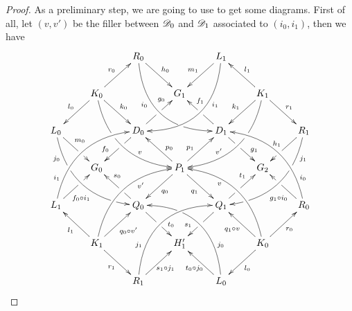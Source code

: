 \begin{proof}  As a preliminary step, we are going to use  to get some diagrams.  First of all, let $(v,v')$ be the filler between $\mathscr{D}_0$ and $\mathscr{D}_1$ associated to $(i_0, i_1)$, then we have
	\[\xymatrix{&&R_0 \ar@/_1cm/[ddrr]_(.35){i_0}|(.7)\hole \ar[dr]^{h_0}&& L_1\ar@/^1cm/[ddll]^(.35){i_1}  \ar[dl]_{m_1}\\&K_0\ar[dr]^{k_0}\ar[dl]_{l_0} \ar@/_.8cm/[ddrr]|(.36)\hole^(.65){v}\ar[ur]^{r_0}&& G_1 && K_1 \ar@/^.8cm/[ddll]|(.36)\hole_(.65){v'}\ar[dl]_{k_1}\ar[lu]_{l_1} \ar[dr]^{r_1}\\L_0 \ar@/_.8cm/[ddrr]_(.2){j_0}|(.31)\hole|(.81)\hole \ar[dr]^(.4){m_0}|(.61)\hole && D_0 \ar[dl]|(.4)\hole_(.65){f_0}\ar[ur]|(.5)\hole^(.7){g_0}&&D_1 \ar[dr]|(.4)\hole^(.65){g_1} \ar[ul]|(.5)\hole_(.65){f_1}&&R_1\ar@/^.8cm/[ddll]^(.2){j_1}|(.31)\hole|(.81)\hole\ar[dl]_{h_1}|(.6)\hole\\&G_0 &&P_1\ar[dr]_{q_1} \ar[dl]^{q_0}\ar[ur]^(.4){p_1}\ar[ul]_(.4){p_0}&&G_2\\L_1 \ar@/^.8cm/[uurr]^(.2){i_1} \ar[ur]_(.35){f_0\circ i_1}|(.61)\hole&&Q_0 \ar[ul]|(.4)\hole_(.65){s_0}\ar[dr]|(.5)\hole^(.65){t_0} &&Q_1\ar[ur]|(.4)\hole^(.65){t_1} \ar[dl]|(.5)\hole_(.65){s_1} && R_0  \ar[ul]^(.35){g_1\circ i_0}|(.61)\hole\ar@/_.8cm/[uull]_(.2){i_0}\\&K_1 \ar[ur]_{q_0\circ v'} \ar[dr]_{r_1} \ar[ul]^{l_1}\ar@/^.8cm/[uurr]_(.65){v'}&&H'_1&& K_0 \ar[ur]_{r_0} \ar[ul]^{q_1\circ v} \ar[dl]^{l_0} \ar@/_.8cm/[uull]^(.65){v}\\&& R_1 \ar[ur]_{\hspace{-5pt}s_1\circ j_1}\ar@/^1cm/[uurr]^(.25){j_1}&& L_0 \ar[ul]^{t_0\circ j_0\hspace{-5pt}} \ar@/_1cm/[uull]_(.25){j_0} |(.69)\hole }\]
	

\end{proof}

